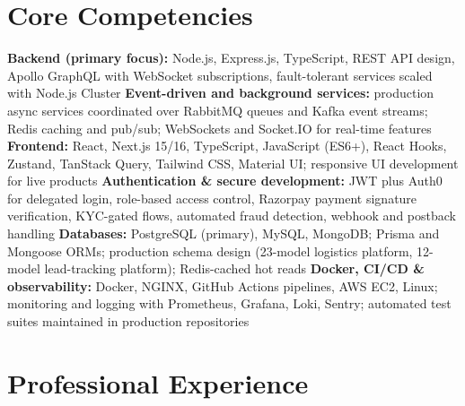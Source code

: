 \documentclass[11pt,a4paper,sans]{moderncv}
\begin{document}
\section{Core Competencies}
\vspace{1pt}
\raggedright
\textbf{Backend (primary focus):} Node.js, Express.js, TypeScript, REST API design, Apollo GraphQL with WebSocket subscriptions, fault-tolerant services scaled with Node.js Cluster \textbar{}
\textbf{Event-driven and background services:} production async services coordinated over RabbitMQ queues and Kafka event streams; Redis caching and pub/sub; WebSockets and Socket.IO for real-time features \textbar{}
\textbf{Frontend:} React, Next.js 15/16, TypeScript, JavaScript (ES6+), React Hooks, Zustand, TanStack Query, Tailwind CSS, Material UI; responsive UI development for live products \textbar{}
\textbf{Authentication \& secure development:} JWT plus Auth0 for delegated login, role-based access control, Razorpay payment signature verification, KYC-gated flows, automated fraud detection, webhook and postback handling \textbar{}
\textbf{Databases:} PostgreSQL (primary), MySQL, MongoDB; Prisma and Mongoose ORMs; production schema design (23-model logistics platform, 12-model lead-tracking platform); Redis-cached hot reads \textbar{}
\textbf{Docker, CI/CD \& observability:} Docker, NGINX, GitHub Actions pipelines, AWS EC2, Linux; monitoring and logging with Prometheus, Grafana, Loki, Sentry; automated test suites maintained in production repositories
\par\normalfont


\section{Professional Experience}
\vspace{3pt}

\end{document}
